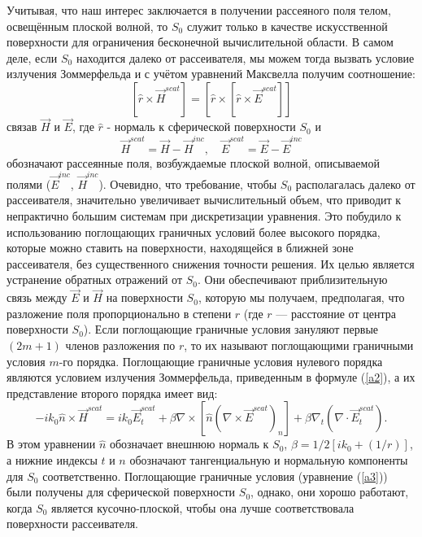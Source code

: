 Учитывая, что наш интерес заключается в получении рассеяного поля телом, освещённым плоской волной, то $S_{0}$ служит только в качестве искусственной поверхности для ограничения бесконечной вычислительной области. В самом деле, если $S_{0}$ находится далеко от рассеивателя, мы можем тогда вызвать условие излучения Зоммерфельда и с учётом уравнений Максвелла получим соотношение:
\begin{equation}\label{a2}
	\left[\hat{r} \times \vec{H}^{scat}\right] = \left[\hat{r} \times \left[\hat{r} \times \vec{E}^{scat}\right]\right]
\end{equation}
		связав $ \vec{H} $ и $ \vec{E} $, где $ \hat{r} $ - нормаль к сферической поверхности $ S_{0} $ и
\begin{equation}
	\vec{H}^{scat} = \vec{H} - \vec{H}^{inc},\quad \vec{E}^{scat} = \vec{E} - \vec{E}^{inc}
\end{equation}
обозначают рассеянные поля, возбуждаемые плоской волной, описываемой полями ($ \vec{E}^{inc} $, $ \vec{H}^{inc} $).
Очевидно, что требование, чтобы $ S_{0} $ располагалась далеко от рассеивателя, значительно увеличивает вычислительный объем, что приводит к непрактично большим системам при дискретизации уравнения. Это побудило к использованию поглощающих граничных условий более высокого порядка, которые можно ставить на поверхности, находящейся в ближней зоне рассеивателя, без существенного снижения точности решения. Их целью является устранение обратных отражений от $ S_{0} $. Они обеспечивают приблизительную связь между $\vec{E}$ и $\vec{H}$ на поверхности $ S_{0} $, которую мы получаем, предполагая, что разложение поля пропорционально в степени $r$ (где $r$ --- расстояние от центра поверхности $S_{0}$). Если поглощающие граничные условия зануляют первые $(2m + 1)$ членов разложения по $r$, то их называют поглощающими граничными условия $m$-го порядка.
Поглощающие граничные условия нулевого порядка являются условием излучения Зоммерфельда, приведенным в формуле (\ref{a2}), а их представление второго порядка имеет вид:
\begin{equation}\label{a3}
	-i k_{0}\hat{n} \times \vec{H}^{scat} = i k_{0}\vec{E}_{t}^{scat} + \beta \nabla \times [\hat{n}(\nabla \times \vec{E}^{scat})_{n}] + \beta\nabla_{t} (\nabla \cdot \vec{E}_{t}^{scat}).
\end{equation}
В этом уравнении $ \hat{n} $ обозначает внешнюю нормаль к $S_{0}$, $\beta = 1/{2[i k_{0} + (1/r)]}$, а нижние индексы $t$ и $n$ обозначают тангенциальную и нормальную компоненты для $ S_{0} $ соответственно. 
Поглощающие граничные условия (уравнение (\ref{a3})) были получены для сферической поверхности $ S_{0} $, однако, они хорошо работают, когда $ S_{0} $ является кусочно-плоской, чтобы она лучше соответствовала поверхности рассеивателя.
